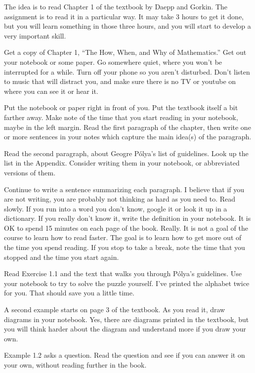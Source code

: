 
The idea is to read Chapter 1 of the textbook by Daepp and Gorkin\DGreference.
The assignment is to read it in a particular way.
It may take 3 hours to get it done, but you will learn something in those three hours, and you will start to develop a very important skill.

Get a copy of Chapter 1, ``The How, When, and Why of Mathematics.''
Get out your notebook or some paper.
Go somewhere quiet, where you won't be interrupted for a while.
Turn off your phone so you aren't disturbed.
Don't listen to music that will distract you, and make sure there is no TV or youtube on where you can see it or hear it.

Put the notebook or paper right in front of you.
Put the textbook itself a bit farther away.
Make note of the time that you start reading in your notebook, maybe in the left margin.
Read the first paragraph of the chapter, then write one or more sentences in your notes which capture the main idea(s) of the paragraph.

Read the second paragraph, about Geogre P\'{o}lya's list of guidelines.
Look up the list in the Appendix.
Consider writing them in your notebook, or abbreviated versions of them.

Continue to write a sentence summarizing each paragraph.
I believe that if you are not writing, you are probably not thinking as hard as you need to.
Read slowly.
If you run into a word you don't know, google it or look it up in a dictionary.  If you really don't know it, write the definition in your notebook.
It is OK to spend 15 minutes on each page of the book.  Really.
It is not a goal of the course to learn how to read faster.
The goal is to learn how to get more out of the time you spend reading.
If you stop to take a break, note the time that you stopped and the time you start again.

Read Exercise 1.1 and the text that walks you through P\'{o}lya's guidelines.
Use your notebook to try to solve the puzzle yourself.
I've printed the alphabet twice for you.  That should save you a little time.

A second example starts on page 3 of the textbook.
As you read it, draw diagrams in your notebook.
Yes, there are diagrams printed in the textbook, but you will think harder about the diagram and understand more if you draw your own.

Example 1.2 asks a question.  Read the question and see if you can answer it on your own, without reading further in the book.

